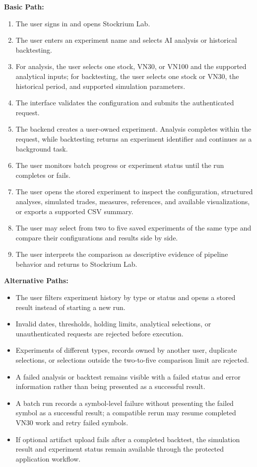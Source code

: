 \noindent\textbf{Basic Path:}
\begin{enumerate}[leftmargin=*, nosep]
    \item The user signs in and opens Stockrium Lab.
    \item The user enters an experiment name and selects AI analysis or historical backtesting.
    \item For analysis, the user selects one stock, VN30, or VN100 and the supported analytical inputs; for backtesting, the user selects one stock or VN30, the historical period, and supported simulation parameters.
    \item The interface validates the configuration and submits the authenticated request.
    \item The backend creates a user-owned experiment. Analysis completes within the request, while backtesting returns an experiment identifier and continues as a background task.
    \item The user monitors batch progress or experiment status until the run completes or fails.
    \item The user opens the stored experiment to inspect the configuration, structured analyses, simulated trades, measures, references, and available visualizations, or exports a supported CSV summary.
    \item The user may select from two to five saved experiments of the same type and compare their configurations and results side by side.
    \item The user interprets the comparison as descriptive evidence of pipeline behavior and returns to Stockrium Lab.
\end{enumerate}

\noindent\textbf{Alternative Paths:}
\begin{itemize}[leftmargin=*, nosep]
    \item The user filters experiment history by type or status and opens a stored result instead of starting a new run.
    \item Invalid dates, thresholds, holding limits, analytical selections, or unauthenticated requests are rejected before execution.
    \item Experiments of different types, records owned by another user, duplicate selections, or selections outside the two-to-five comparison limit are rejected.
    \item A failed analysis or backtest remains visible with a failed status and error information rather than being presented as a successful result.
    \item A batch run records a symbol-level failure without presenting the failed symbol as a successful result; a compatible rerun may resume completed VN30 work and retry failed symbols.
    \item If optional artifact upload fails after a completed backtest, the simulation result and experiment status remain available through the protected application workflow.
\end{itemize}

